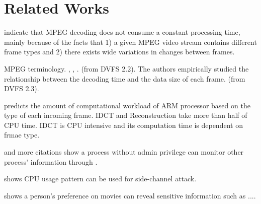 \section{Related Works}
\label{sec:relatedworks}

\cite{MPEGPredict}\cite{DVFS} indicate that MPEG\cite{MPEG} decoding does not consume a constant processing time, mainly because of the facts that 1) a given MPEG video stream contains different frame types and 2) there exists wide variations in changes between frames. 


\cite{MPEG} MPEG terminology. , , . (from DVFS 2.2). 
The authors empirically studied the relationship between the decoding time and the data size of each frame.  (from DVFS 2.3). 

\cite{DVFS}  predicts the amount of computational workload of ARM processor based on the type of each incoming frame.
IDCT and Reconstruction take more than half of CPU time. 
IDCT is CPU intensive and its computation time is dependent on frmae type.

\cite{MEMENTO} and more citations show a process without admin privilege can monitor other process' information through . 

shows CPU usage pattern can be used for side-channel attack. 

shows a person's preference on movies can reveal sensitive information such as ....
